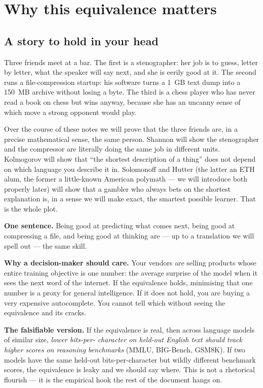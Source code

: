 \tableofcontents
\newpage

\section{Why this equivalence matters}
\label{sec:why}

\subsection*{A story to hold in your head}

Three friends meet at a bar. The first is a stenographer: her job is
to guess, letter by letter, what the speaker will say next, and she
is eerily good at it. The second runs a file-compression startup: his
software turns a 1~GB text dump into a 150~MB archive without losing
a byte. The third is a chess player who has never read a book on
chess but wins anyway, because she has an uncanny sense of which move
a strong opponent would play.

Over the course of these notes we will prove that the three friends
are, in a precise mathematical sense, the same person. Shannon will
show the stenographer and the compressor are literally doing the same
job in different units. Kolmogorov will show that ``the shortest
description of a thing'' does not depend on which language you
describe it in. Solomonoff and Hutter (the latter an ETH alum, the
former a little-known American polymath --- we will introduce both
properly later) will show that a gambler who always bets on the
shortest explanation is, in a sense we will make exact, the smartest
possible learner. That is the whole plot.

\begin{intuition}
\textbf{One sentence.} Being good at predicting what comes next,
being good at compressing a file, and being good at thinking are ---
up to a translation we will spell out --- the same skill.

\smallskip
\textbf{Why a decision-maker should care.} Your vendors are selling
products whose entire training objective is one number: the average
surprise of the model when it sees the next word of the internet.
If the equivalence holds, minimising that one number is a proxy for
general intelligence. If it does not hold, you are buying a very
expensive autocomplete. You cannot tell which without seeing the
equivalence and its cracks.

\smallskip
\textbf{The falsifiable version.} If the equivalence is real, then
across language models of similar size, \emph{lower bits-per-
character on held-out English text should track higher scores on
reasoning benchmarks} (MMLU, BIG-Bench, GSM8K). If two models have
the same held-out bits-per-character but wildly different benchmark
scores, the equivalence is leaky and we should say where. This is
not a rhetorical flourish --- it is the empirical hook the rest of
the document hangs on.
\end{intuition}

